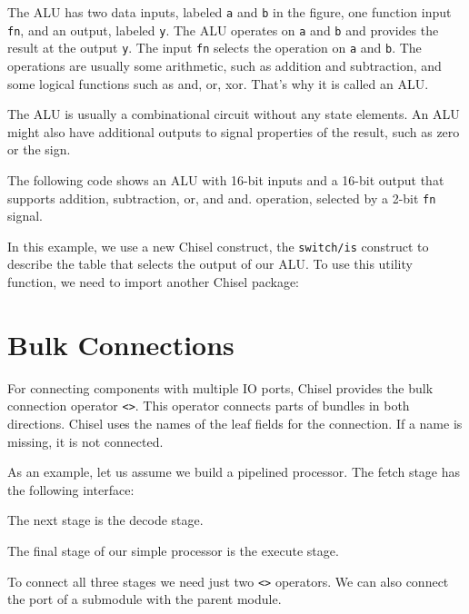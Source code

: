 \documentclass[%
    10pt,
    headinclude, footinclude=false,
    openright, %
    notitlepage,
    cleardoublepage=empty,
    headsepline,
    numbers=noenddot,
    bibliography=totoc, index=totoc,
    ]{scrbook}
\newcommand{\code}[1]{{\lstinline[basicstyle=\small\ttfamily]{#1}}}
\begin{document}
The ALU has two data inputs, labeled \code{a} and \code{b} in the figure, one function input \code{fn},
and an output, labeled \code{y}. The ALU operates on \code{a} and \code{b} and provides the result
at the output \code{y}. The input \code{fn} selects the operation on \code{a} and \code{b}.
The operations are usually some arithmetic, such as addition and subtraction, and some logical
functions such as and, or, xor. That's why it is called an ALU.

The ALU is usually a combinational circuit without any state elements.
An ALU might also have additional outputs to signal properties
of the result, such as zero or the sign.


The following code shows an ALU with 16-bit inputs and a 16-bit output that supports
addition, subtraction, or, and and.
operation, selected by a 2-bit \code{fn} signal.


\noindent In this example, we use a new Chisel construct, the \code{switch/is} construct to describe
the table that selects the output of our ALU.
To use this utility function, we need to import another Chisel package:


\section{Bulk Connections}


For connecting components with multiple IO ports, Chisel provides the
bulk connection operator \code{<>}. This operator connects parts of bundles
in both directions. Chisel uses the names of the leaf fields for the connection.
If a name is missing, it is not connected.

As an example, let us assume we build a pipelined processor. The fetch
stage has the following interface:

\noindent The next stage is the decode stage.

\noindent The final stage of our simple processor is the execute stage.

To connect all three stages we need just two \code{<>} operators.
We can also connect the port of a submodule with the parent module.
\end{document}

